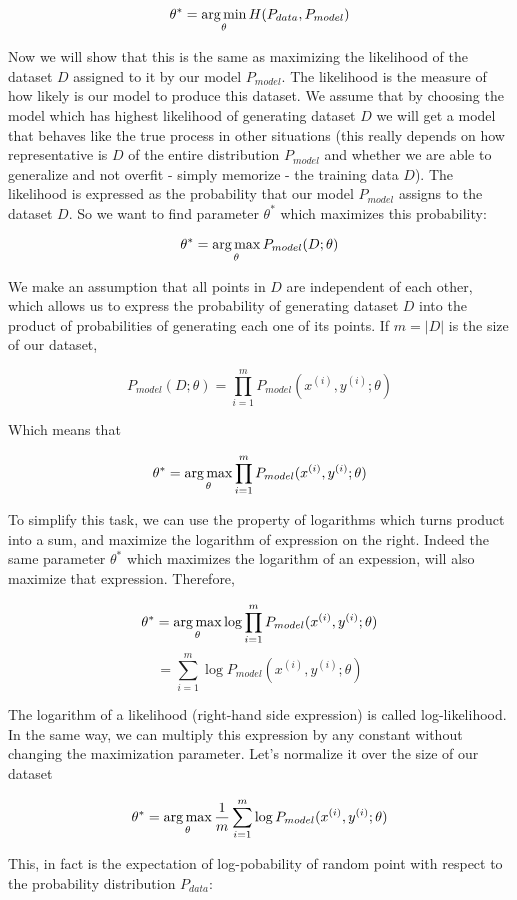 \[ \theta^{*} = \operatorname*{arg\,min}_{\theta} H(P_{data}, P_{model}) \]

Now we will show that this is the same as maximizing the likelihood of the dataset $D$ assigned to it by our model $P_{model}$. The likelihood is the measure of how likely is our model to produce this dataset. We assume that by choosing the model which has highest likelihood of generating dataset $D$ we will get a model that behaves like the true process in other situations (this really depends on how representative is $D$ of the entire distribution $P_{model}$ and whether we are able to generalize and not overfit - simply memorize - the training data $D$). The likelihood is expressed as the probability that our model $P_{model}$ assigns to the dataset $D$. So we want to find parameter $\theta^{*}$ which maximizes this probability:

\[ \theta^{*} = \operatorname*{arg\,max}_{\theta} P_{model}(D;\theta) \]

We make an assumption that all points in $D$ are independent of each other, which allows us to express the probability of generating dataset $D$ into the product of probabilities of generating each one of its points. If $m = |D|$ is the size of our dataset,

\[ P_{model}(D;\theta) = \prod_{i=1}^m P_{model}(x^{(i)}, y^{(i)};\theta) \]

Which means that

\[ \theta^{*} = \operatorname*{arg\,max}_{\theta} \prod_{i=1}^m P_{model}(x^{(i)}, y^{(i)};\theta) \]

To simplify this task, we can use the property of logarithms which turns product into a sum, and maximize the logarithm of expression on the right. Indeed the same parameter $\theta^{*}$ which maximizes the logarithm of an expession, will also maximize that expression. Therefore,

 \[ \theta^{*} = \operatorname*{arg\,max}_{\theta} \log \prod_{i=1}^m P_{model}(x^{(i)}, y^{(i)};\theta) \]
 \[ = \sum_{i=1}^m \log P_{model}(x^{(i)}, y^{(i)};\theta) \]

 The logarithm of a likelihood (right-hand side expression) is called log-likelihood. In the same way, we can multiply this expression by any constant without changing the maximization parameter. Let's normalize it over the size of our dataset

 \[ \theta^{*} = \operatorname*{arg\,max}_{\theta} \frac{1}{m}\sum_{i=1}^m \log P_{model}(x^{(i)}, y^{(i)};\theta) \]

 This, in fact is the expectation of log-pobability of random point with respect to the probability distribution $P_{data}$:

